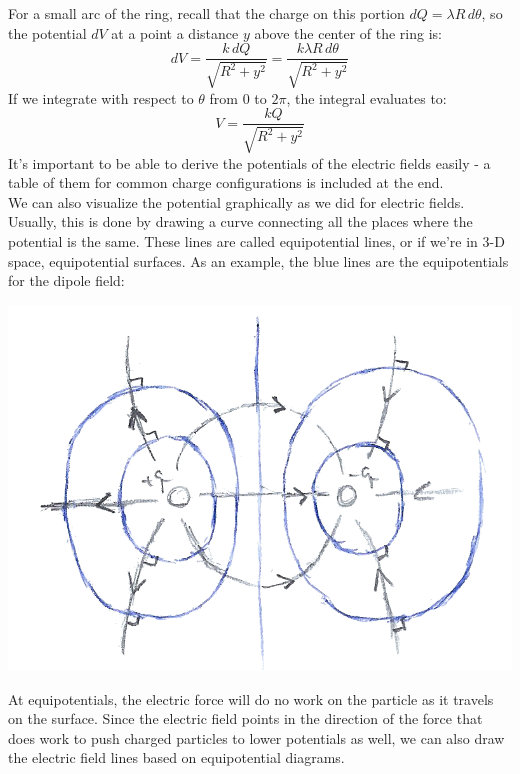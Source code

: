 For a small arc of the ring, recall that the charge on this portion $dQ = \lambda R \, d\theta$, so the potential $dV$ at a point a distance $y$ above the center of the ring is:
\[
	dV = \frac{k\, dQ}{\sqrt{R^2+y^2}} = \frac{k\lambda R \, d\theta}{\sqrt{R^2+y^2}}
\]
If we integrate with respect to $\theta$ from $0$ to $2\pi$, the integral evaluates to:
\[
	V = \frac{kQ}{\sqrt{R^2+y^2}}
\]
It's important to be able to derive the potentials of the electric fields easily - a table of them for common charge configurations is included at the end. \\
We can also visualize the potential graphically as we did for electric fields. Usually, this is done by drawing a curve connecting all the places where the potential is the same. These lines are called equipotential lines, or if we're in 3-D space, equipotential surfaces. As an example, the blue lines are the equipotentials for the dipole field:
\begin{center}
	\includegraphics[scale=0.3]{images/em/equipotentials.png}
\end{center}
At equipotentials, the electric force will do no work on the particle as it travels on the surface. Since the electric field points in the direction of the force that does work to push charged particles to lower potentials as well, we can also draw the electric field lines based on equipotential diagrams. 
